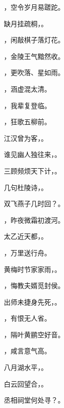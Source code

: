 \documentclass[12pt, a4paper, addpoints]{exam}
\begin{document}
\begin{questions}
\question[1] \uline{\qquad\qquad\qquad\qquad}，空令岁月易蹉跎。

\question[2] 缺月挂疏桐，\uline{\qquad\qquad\qquad\qquad}。

\question[2] \uline{\qquad\qquad\qquad\qquad}，闲敲棋子落灯花。

\question[2] \uline{\qquad\qquad\qquad\qquad}，金陵王气黯然收。

\question[2] \uline{\qquad\qquad\qquad\qquad}，更吹落、星如雨。

\question[2] \uline{\qquad\qquad\qquad\qquad}，涵虚混太清。

\question[2] \uline{\qquad\qquad\qquad\qquad}，我辈复登临。

\question[2] \uline{\qquad\qquad\qquad\qquad}，狂歌五柳前。

\question[1] 江汉曾为客，\uline{\qquad\qquad\qquad\qquad}。

\question[2] 谁见幽人独往来，\uline{\qquad\qquad\qquad\qquad}。

\question[2] 三顾频烦天下计，\uline{\qquad\qquad\qquad\qquad}。

\question[2] 几句杜陵诗，\uline{\qquad\qquad\qquad\qquad}。

\question[2] 双飞燕子几时回？\uline{\qquad\qquad\qquad\qquad}。

\question[1] \uline{\qquad\qquad\qquad\qquad}，昨夜微霜初渡河。

\question[2] 太乙近天都，\uline{\qquad\qquad\qquad\qquad}。

\question[2] \uline{\qquad\qquad\qquad\qquad}，万里送行舟。

\question[2] 黄梅时节家家雨，\uline{\qquad\qquad\qquad\qquad}。

\question[2] \uline{\qquad\qquad\qquad\qquad}，悔教夫婿觅封侯。

\question[2] 出师未捷身先死，\uline{\qquad\qquad\qquad\qquad}。

\question[2] \uline{\qquad\qquad\qquad\qquad}，有恨无人省。

\question[2] \uline{\qquad\qquad\qquad\qquad}，隔叶黄鹂空好音。

\question[2] \uline{\qquad\qquad\qquad\qquad}，咸言意气高。

\question[2] 八月湖水平，\uline{\qquad\qquad\qquad\qquad}。

\question[2] 白云回望合，\uline{\qquad\qquad\qquad\qquad}。

\question[2] 丞相祠堂何处寻？\uline{\qquad\qquad\qquad\qquad}。

\end{questions}
\end{document}
